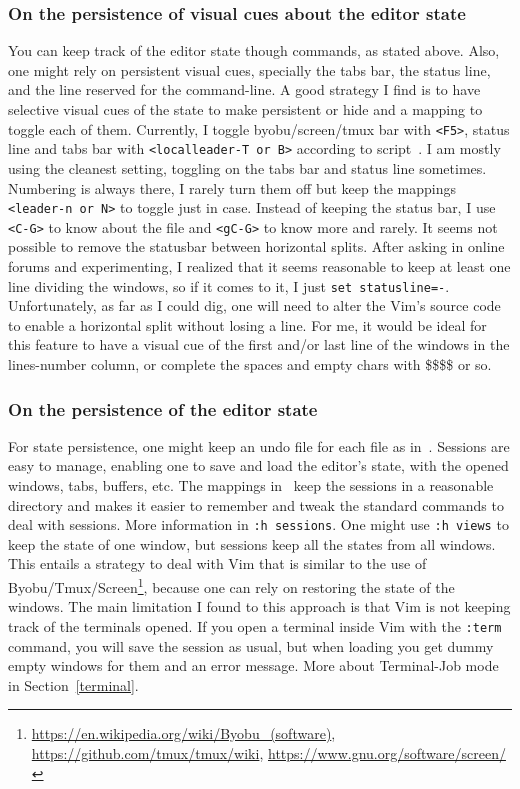 \documentclass{article}
\newcommand{\ttt}[1] {
	\texttt{<#1>}}
\newcommand{\tttt}[1]{\texttt{#1}}
\begin{document}
\subsubsection{On the persistence of visual cues about the editor state}\label{visual1}
You can keep track of the editor state though commands, as stated
above.
Also, one might rely on persistent visual
cues, specially the tabs bar, the status line, and the line
reserved for the command-line.
A good strategy I find is to have selective visual cues of the state to make persistent or hide
and a mapping to toggle each of them.
Currently, I toggle byobu/screen/tmux bar with \ttt{F5},
status line and tabs bar with \ttt{localleader-T or B} according to script~\cite{vimrc}.
I am mostly using the cleanest setting, toggling on the tabs bar and status line sometimes.
Numbering is always there, I rarely turn them off but keep the mappings \ttt{leader-n or N} to toggle just in case.
Instead of keeping the status bar, I use \ttt{C-G} to know about the
file and \ttt{gC-G} to know more and rarely.
It seems not possible to remove the statusbar between horizontal splits.
After asking in online forums and experimenting, I realized that it seems
reasonable to keep at least one line dividing the windows, so
if it comes to it, I just \tttt{set statusline=-}.
Unfortunately, as far as I could dig, one will need to alter
the Vim's source code to enable a horizontal split without losing a line.
For me, it would be ideal for this feature to have a visual cue of the
first and/or last line of the windows in the lines-number
column, or complete the spaces and empty chars with \$\$\$\$ or so.

\subsubsection{On the persistence of the editor state}
For state persistence, one might keep an undo file for each file as
in~\cite{vimrc}.
Sessions are easy to manage, enabling one to save and load the
editor's state, with the opened windows, tabs, buffers, etc.
The mappings in~\cite{vimrc} keep the sessions
in a reasonable directory and makes it easier to remember and tweak
the standard commands to deal with sessions.
More information in \tttt{:h sessions}.
One might use \tttt{:h views} to keep the state of one window,
but sessions keep all the states from all windows.
This entails a strategy to deal with Vim that is similar to
the use of
Byobu/Tmux/Screen\footnote{\url{https://en.wikipedia.org/wiki/Byobu_(software)},
\url{https://github.com/tmux/tmux/wiki},
\url{https://www.gnu.org/software/screen/}},
because one can rely on restoring the state of the windows.
The main limitation I found to this approach is that
Vim is not keeping track of the terminals opened.
If you open a terminal inside Vim with the \tttt{:term}
command, you will save the session as usual, but when loading
you get dummy empty windows for them and an error message.
More about Terminal-Job mode in Section~\ref{terminal}.
\end{document}
